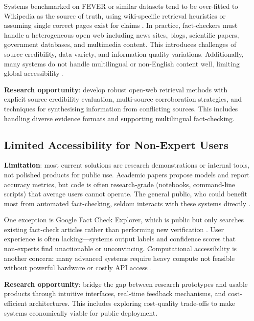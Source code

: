 \documentclass[12pt,a4paper]{article}
\begin{document}
Systems benchmarked on FEVER or similar datasets tend to be over-fitted to Wikipedia as the source of truth, using wiki-specific retrieval heuristics or assuming single correct pages exist for claims \citep{thorne2018fever}. In practice, fact-checkers must handle a heterogeneous open web including news sites, blogs, scientific papers, government databases, and multimedia content. This introduces challenges of source credibility, data variety, and information quality variations. Additionally, many systems do not handle multilingual or non-English content well, limiting global accessibility \citep{aly2021feverous}.

\textbf{Research opportunity}: develop robust open-web retrieval methods with explicit source credibility evaluation, multi-source corroboration strategies, and techniques for synthesising information from conflicting sources. This includes handling diverse evidence formats and supporting multilingual fact-checking.

\subsection{Limited Accessibility for Non-Expert Users}

\textbf{Limitation}: most current solutions are research demonstrations or internal tools, not polished products for public use. Academic papers propose models and report accuracy metrics, but code is often research-grade (notebooks, command-line scripts) that average users cannot operate. The general public, who could benefit most from automated fact-checking, seldom interacts with these systems directly \citep{lin2025factaudit}.

One exception is Google Fact Check Explorer, which is public but only searches existing fact-check articles rather than performing new verification \citep{google2024factcheck}. User experience is often lacking—systems output labels and confidence scores that non-experts find unactionable or unconvincing. Computational accessibility is another concern: many advanced systems require heavy compute not feasible without powerful hardware or costly API access \citep{lin2025factaudit}.

\textbf{Research opportunity}: bridge the gap between research prototypes and usable products through intuitive interfaces, real-time feedback mechanisms, and cost-efficient architectures. This includes exploring cost-quality trade-offs to make systems economically viable for public deployment.
\end{document}
